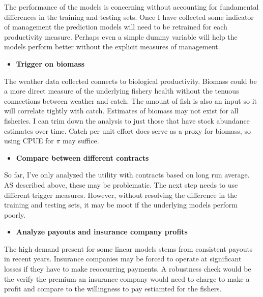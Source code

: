 \documentclass[
  letterpaper,
  DIV=11,
  numbers=noendperiod]{scrartcl}
\providecommand{\tightlist}{%
  \setlength{\itemsep}{0pt}\setlength{\parskip}{0pt}}\usepackage{longtable,booktabs,array}
\begin{document}
The performance of the models is concerning without accounting for
fundamental differences in the training and testing sets. Once I have
collected some indicator of management the prediction models will need
to be retrained for each productivity measure. Perhaps even a simple
dummy variable will help the models perform better without the explicit
measures of management.

\begin{itemize}
\tightlist
\item
  \textbf{Trigger on biomass}
\end{itemize}

The weather data collected connects to biological productivity. Biomass
could be a more direct measure of the underlying fishery health without
the tenuous connections between weather and catch. The amount of fish is
also an input so it will correlate tightly with catch. Estimates of
biomass may not exist for all fisheries. I can trim down the analysis to
just those that have stock abundance estimates over time. Catch per unit
effort does serve as a proxy for biomass, so using CPUE for \(\pi\) may
suffice.

\begin{itemize}
\tightlist
\item
  \textbf{Compare between different contracts}
\end{itemize}

So far, I've only analyzed the utility with contracts based on long run
average. AS described above, these may be problematic. The next step
needs to use different trigger measures. However, without resolving the
difference in the training and testing sets, it may be moot if the
underlying models perform poorly.

\begin{itemize}
\tightlist
\item
  \textbf{Analyze payouts and insurance company profits}
\end{itemize}

The high demand present for some linear models stems from consistent
payouts in recent years. Insurance companies may be forced to operate at
significant losses if they have to make reoccurring payments. A
robustness check would be the verify the premium an insurance company
would need to charge to make a profit and compare to the willingness to
pay estiamted for the fishers.

\newpage
\appendix
\renewcommand{\thefigure}{A\arabic{figure}}
\renewcommand{\thetable}{A\arabic{table}}
\setcounter{figure}{0}
\setcounter{table}{0}
\end{document}
